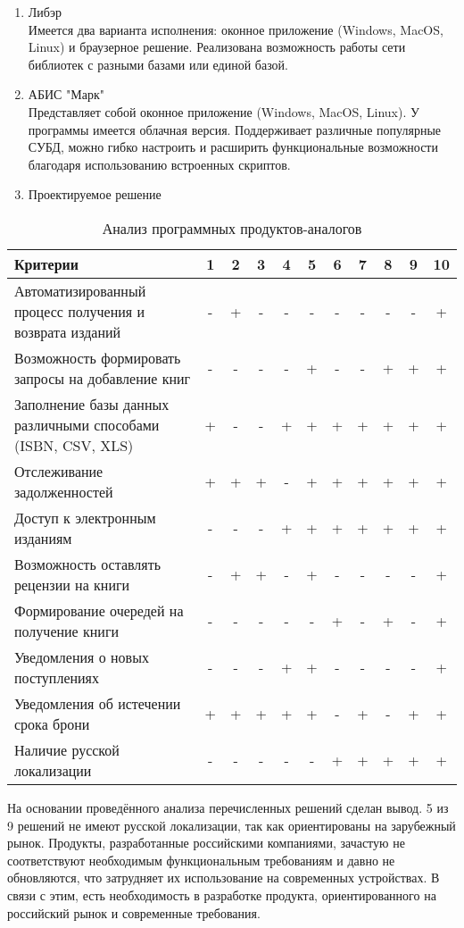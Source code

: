 \documentclass[./intro.tex]{subfiles}
\begin{document}
\begin{enumerate}
    \item Либэр \cite{Liber} \\
    Имеется два варианта исполнения: оконное приложение (Windows, MacOS, Linux) и браузерное решение. Реализована возможность работы сети библиотек с разными базами или единой базой.
    \item АБИС "Марк" \cite{ABISmark} \\
    Представляет собой оконное приложение (Windows, MacOS, Linux). У программы имеется облачная версия. Поддерживает различные популярные СУБД, можно гибко настроить и расширить функциональные возможности благодаря использованию встроенных скриптов.
    \item Проектируемое решение
\end{enumerate}

\begin{table}[h]
    \caption{Анализ программных продуктов-аналогов}
    \label{table:1}
    \begin{tabular}{|p{8.5cm}|c|c|c|c|c|c|c|c|c|c|}
        \hline
        Критерии & 1 & 2 & 3 & 4 & 5 & 6 & 7 & 8 & 9 & 10\\
        \hline
        Автоматизированный процесс получения и возврата изданий & - & + & - & - & - & - & - & - & - & + \\
        \hline
        Возможность формировать запросы на добавление книг & - & - & - & - & + & - & - & + & + & + \\
        \hline
        Заполнение базы данных различными способами (ISBN, CSV, XLS) & + & - & - & + & + & + & + & + & + & + \\
        \hline
        Отслеживание задолженностей & + & + & + & - & + & + & + & + & + & + \\
        \hline
        Доступ к электронным изданиям & - & - & - & + & + & + & + & + & + & + \\
        \hline
        Возможность оставлять рецензии на книги & - & + & + & - & + & - & - & - & - & + \\
        \hline
        Формирование очередей на получение книги & - & - & - & - & - & + & - & + & - & + \\
        \hline
        Уведомления о новых поступлениях & - & - & - & + & + & - & - & - & - & + \\
        \hline
        Уведомления об истечении срока брони & + & + & + & + & + & - & + & - & + & + \\
        \hline
        Наличие русской локализации & - & - & - & - & - & + & + & + & + & + \\
        \hline
    \end{tabular}    
\end{table}

\par На основании проведённого анализа перечисленных решений сделан вывод. 5 из 9 решений не имеют русской локализации, так как ориентированы на зарубежный рынок.
Продукты, разработанные российскими компаниями, зачастую не соответствуют необходимым функциональным требованиям и давно не обновляются, что затрудняет их использование на современных устройствах.
В связи с этим, есть необходимость в разработке продукта, ориентированного на российский рынок и современные требования.
\end{document}
